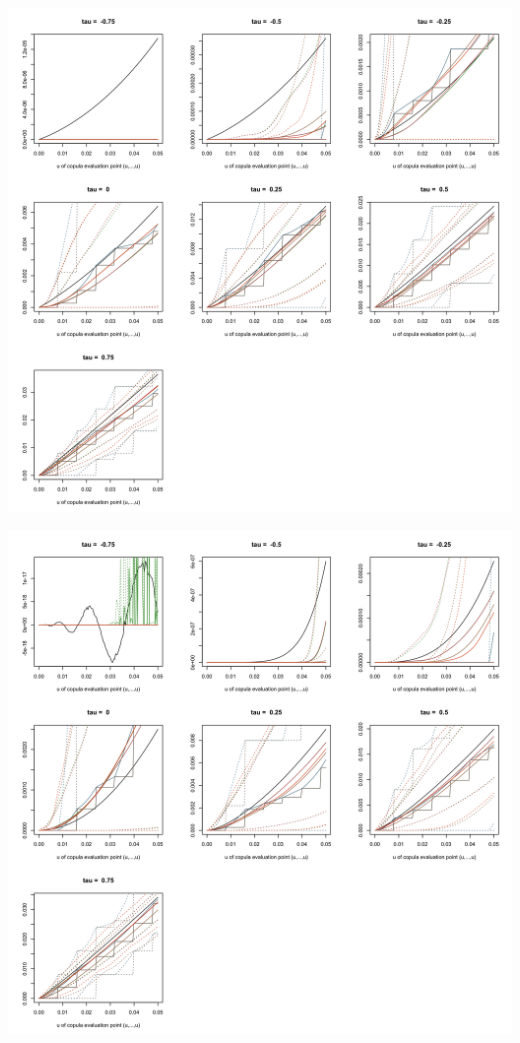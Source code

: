 \documentclass[12pt]{report}
\newcommand{\1}{\mathbf{1}}
\begin{document}
\begin{flushleft}
\begin{center}
\label{t4_2d_c}
\includegraphics[width=17cm]{CumulativeProb/t4_2d_c.png}
\end{center}%

\begin{center}
\label{N_2d_c}
\includegraphics[width=17cm]{CumulativeProb/N_2d_c.png}
\end{center}%


\end{flushleft}
\end{document}

